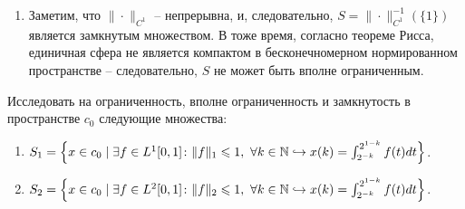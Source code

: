 \begin{solve}
\begin{enumerate}
        Поскольку $S$ -- вполне ограничено в $C[0, 1]$, то при всяком $\epsilon > 0$ существует конечная $\epsilon$-сеть из элементов $S$. Но, заметим, что эта же $\epsilon$-сеть будет $2\epsilon$-сетью для $\overline{S}$ в $(C^1[0, 1], \|\cdot\|_C)$ -- поскольку норма не изменилась. Следовательно, замыкание $S$ будет вполне ограниченным.
        \item Заметим, что $\|\cdot\|_{C^1}$ -- непрерывна, и, следовательно, $S = \|\cdot\|_{C^1}^{-1}(\{1\})$ является замкнутым множеством. В тоже время, согласно теореме Рисса, единичная сфера не является компактом в бесконечномерном нормированном пространстве -- следовательно, $S$ не может быть вполне ограниченным.
    \end{enumerate}
\end{solve}
\begin{task}[T11]
    Исследовать на ограниченность, вполне ограниченность и замкнутость в пространстве $c_0$ следующие множества:
    \begin{enumerate}
        \item $S_1 = \left\{x \in c_0 \mid \exists f \in L^1[0, 1]\colon \|f\|_1 \leqslant 1, \ \forall k \in \mathbb{N} \hookrightarrow x(k) = \int_{2^{-k}}^{2^{1 - k}} f(t)dt\right\}$.
        \item $S_2 = \left\{x \in c_0 \mid \exists f \in L^2[0, 1]\colon \|f\|_2 \leqslant 1, \ \forall k \in \mathbb{N} \hookrightarrow x(k) = \int_{2^{-k}}^{2^{1 - k}} f(t)dt\right\}$.
    \end{enumerate}
\end{task}
